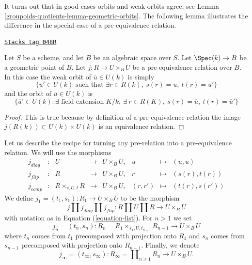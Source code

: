It turns out that in good cases orbits and weak orbits agree, see
Lemma \ref{groupoids-quotients-lemma-geometric-orbits}. The following lemma illustrates
the difference in the special case of a pre-equivalence relation.

\begin{lemma}
\label{groupoids-quotients-lemma-weak-orbit-pre-equivalence}
\href{https://stacks.math.columbia.edu/tag/048R}{\texttt{Stacks tag 048R}}

Let $S$ be a scheme, and let $B$ be an algebraic space over $S$.
Let $\Spec(k) \to B$ be a geometric point of $B$.
Let $j : R \to U \times_B U$ be a pre-equivalence relation over $B$.
In this case the weak orbit of $\overline{u} \in U(k)$ is simply
$$
\{
\overline{u}' \in U(k)
\text{ such that }
\exists \overline{r} \in R(k),
\ s(\overline{r}) = \overline{u},
\ t(\overline{r}) = \overline{u}'
\}
$$
and the orbit of $\overline{u} \in U(k)$ is
$$
\{
\overline{u}' \in U(k) :
\exists\text{ field extension }K/k, \ \exists\ r \in R(K),
\ s(r) = \overline{u}, \ t(r) = \overline{u}'\}
$$
\end{lemma}

\begin{proof}
This is true because by definition of a pre-equivalence relation the image
$j(R(k)) \subset U(k) \times U(k)$ is an equivalence relation.
\end{proof}

Let us describe the recipe for turning any pre-relation into a
pre-equivalence relation. We will use the morphisms
\begin{equation}
\label{equation-list}
\begin{matrix}
j_{diag} &
: &
U &
\longrightarrow &
U \times_B U, &
u &
\longmapsto &
(u, u) \\
j_{flip} &
: &
R &
\longrightarrow &
U \times_B U, &
r &
\longmapsto &
(s(r), t(r)) \\
j_{comp} &
: &
R \times_{s, U, t} R &
\longrightarrow &
U \times_B U, &
(r, r') &
\longmapsto &
(t(r), s(r'))
\end{matrix}
\end{equation}
We define $j_1 = (t_1, s_1) : R_1 \to U \times_B U$ to be the morphism
$$
j \amalg j_{diag} \amalg j_{flip} :
R \amalg U \amalg R
\longrightarrow
U \times_B U
$$
with notation as in
Equation (\ref{equation-list}).
For $n > 1$ we set
$$
j_n = (t_n, s_n) :
R_n = R_1 \times_{s_1, U, t_{n - 1}} R_{n - 1} \longrightarrow U \times_B U
$$
where $t_n$ comes from $t_1$ precomposed with projection onto $R_1$ and
$s_n$ comes from $s_{n - 1}$ precomposed with projection onto $R_{n - 1}$.
Finally, we denote
$$
j_\infty = (t_\infty, s_\infty) :
R_\infty = \coprod\nolimits_{n \geq 1} R_n
\longrightarrow
U \times_B U.
$$

